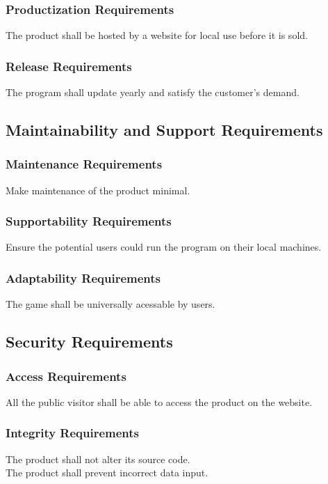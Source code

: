 \documentclass[12pt, titlepage]{article}
\begin{document}
\subsubsection{Productization Requirements}
The product shall be hosted by a website for local use before it is sold. 

\subsubsection{Release Requirements}
The program shall update yearly and satisfy the customer’s demand.


\subsection{Maintainability and Support Requirements}
\subsubsection*{Maintenance Requirements}
Make maintenance of the product minimal.


\subsubsection{Supportability Requirements}
Ensure the potential users could run the program on their local machines.


\subsubsection{Adaptability Requirements}
The game shall be universally acessable by users.


\subsection{Security Requirements}
\subsubsection*{Access Requirements}
All the public visitor shall be able to access the product on the website. 

\subsubsection{Integrity Requirements}
The product shall not alter its source code. \\
The product shall prevent incorrect data input.\\
\end{document}
